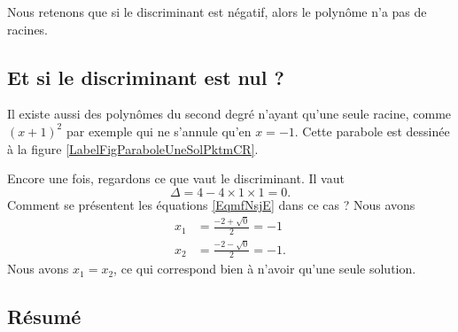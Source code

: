 Nous retenons que si le discriminant est négatif, alors le polynôme n'a pas de racines.

\subsection{Et si le discriminant est nul ?}

Il existe aussi des polynômes du second degré n'ayant qu'une seule racine, comme \( (x+1)^2\) par exemple qui ne s'annule qu'en \( x=-1\). Cette parabole est dessinée à la figure \ref{LabelFigParaboleUneSolPktmCR}.
\newcommand{\CaptionFigParaboleUneSolPktmCR}{La parabole \( (x+1)^2\) ne s'annule qu'en un seul point.}

Encore une fois, regardons ce que vaut le discriminant. Il vaut
\begin{equation}
    \Delta=4-4\times 1\times 1=0.
\end{equation}
Comment se présentent les équations \ref{EqmfNsjE} dans ce cas ? Nous avons
\begin{subequations}
    \begin{align}
        x_1&=\frac{ -2+\sqrt{0} }{ 2 }=-1\\
        x_2&=\frac{ -2-\sqrt{0} }{ 2 }=-1.
    \end{align}
\end{subequations}
Nous avons \( x_1=x_2\), ce qui correspond bien à n'avoir qu'une seule solution.

\subsection{Résumé}

